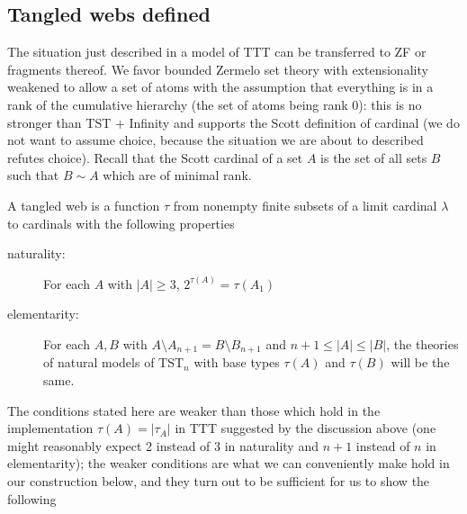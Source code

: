 \documentclass[12pt]{article}
\begin{document}
\newpage

\subsection{Tangled webs defined}

The situation just described in a model of TTT can be transferred to ZF or fragments thereof.  We favor bounded Zermelo set theory with extensionality weakened to allow a set of atoms with the assumption that everything is
in a rank of the cumulative hierarchy (the set of atoms being rank 0):  this is no stronger than TST + Infinity and supports the Scott definition of cardinal (we do not want to assume choice, because the situation we are about to described refutes choice).  Recall that the Scott cardinal of a set $A$ is the set of all sets $B$ such that $B \sim A$ which are of minimal rank.

A tangled web is a function $\tau$ from nonempty finite subsets of a limit cardinal $\lambda$ to cardinals with the following properties

\begin{description}

\item[naturality:]  For each $A$ with $|A| \geq 3$, $2^{\tau(A)} = \tau(A_1)$

\item[elementarity:]  For each $A,B$ with $A\setminus A_{n+1} = B \setminus B_{n+1}$ and $n+1\leq|A|\leq |B|$, the theories of natural models of TST$_n$ with base types $\tau(A)$ and $\tau(B)$ will be the same.

\end{description}

The conditions stated here are weaker than those which hold in the implementation $\tau(A) = |\tau_A|$ in TTT suggested by the discussion above (one might reasonably expect 2 instead of 3 in naturality and $n+1$ instead of $n$ in elementarity);  the weaker conditions are what we can conveniently make hold in our construction below, and they turn out to be sufficient 
for us to show the following
\end{document}
